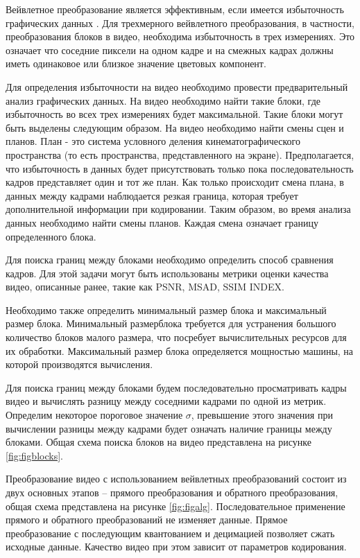 Вейвлетное преобразование является эффективным, если имеется избыточность графических данных \cite{Pup11}. Для трехмерного вейвлетного преобразования, в частности,
преобразования блоков в видео, необходима избыточность в трех измерениях. Это означает что соседние пиксели на одном кадре и на смежных кадрах должны иметь одинаковое 
или близкое значение цветовых компонент. 

Для определения избыточности на видео необходимо провести предварительный анализ графических данных. На видео необходимо найти такие блоки,
где избыточность во всех трех измерениях будет максимальной. Такие блоки могут быть выделены следующим образом. На видео необходимо найти смены сцен и планов.
План - это система условного деления кинематографического пространства (то есть пространства, представленного на экране). 
Предполагается, что избыточность в данных будет присутствовать только пока последовательность кадров представляет один и тот же план. Как только происходит смена плана,
в данных между кадрами наблюдается резкая граница, которая требует дополнительной информации при кодировании.
Таким образом, во время анализа данных необходимо найти смены планов. Каждая смена означает границу определенного блока.

Для поиска границ между блоками необходимо определить способ сравнения кадров. Для этой задачи могут быть использованы метрики оценки качества видео, описанные ранее,
такие как PSNR, MSAD, SSIM INDEX.

Необходимо также определить минимальный размер блока и максимальный размер блока. Минимальный размерблока требуется для устранения большого количество блоков
малого размера, что посребует вычислительных ресурсов для их обработки.
Максимальный размер блока определяется мощностью машины, на которой производятся вычисления.

Для поиска границ между блоками будем последовательно просматривать кадры видео и вычислять разницу между соседними кадрами по одной из метрик. 
Определим некоторое пороговое значение $\sigma$, превышение этого значения при вычислении разницы между кадрами будет означать 
наличие границы между блоками. Общая схема поиска блоков на видео представлена на рисунке \ref{fig:figblocks}. 



Преобразование видео с использованием вейвлетных преобразований состоит из двух основных этапов – 
прямого преобразования и обратного преобразования, общая схема представлена на рисунке \ref{fig:figalg}. 
Последовательное применение прямого и обратного преобразований не изменяет данные.
Прямое преобразование с последующим квантованием и децимацией позволяет сжать
исходные данные. Качество видео при этом зависит от параметров кодирования.

